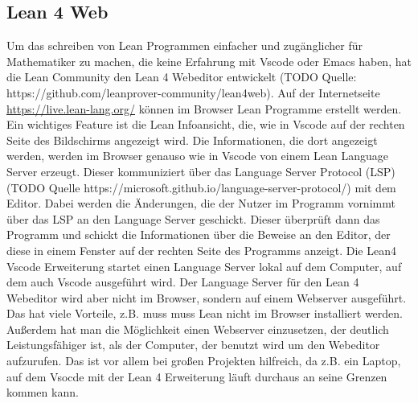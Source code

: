 \documentclass[10pt]{article}
\begin{document}
\subsection{Lean 4 Web}
Um das schreiben von Lean Programmen einfacher und zugänglicher für Mathematiker zu machen, die keine Erfahrung mit Vscode oder Emacs haben, hat die Lean Community den Lean 4 Webeditor entwickelt (TODO Quelle: https://github.com/leanprover-community/lean4web). Auf der Internetseite \href{https://live.lean-lang.org/}{https://live.lean-lang.org/} können im Browser Lean Programme erstellt werden. Ein wichtiges Feature ist die Lean Infoansicht, die, wie in Vscode auf der rechten Seite des Bildschirms angezeigt wird. Die Informationen, die dort angezeigt werden, werden im Browser genauso wie in Vscode von einem Lean Language Server erzeugt. Dieser kommuniziert über das Language Server Protocol (LSP)(TODO Quelle https://microsoft.github.io/language-server-protocol/) mit dem Editor. Dabei werden die Änderungen, die der Nutzer im Programm vornimmt über das LSP an den Language Server geschickt. Dieser überprüft dann das Programm und schickt die Informationen über die Beweise an den Editor, der diese in einem Fenster auf der rechten Seite des Programms anzeigt. Die Lean4 Vscode Erweiterung startet einen Language Server lokal auf dem Computer, auf dem auch Vscode ausgeführt wird. Der Language Server für den Lean 4 Webeditor wird aber nicht im Browser, sondern auf einem Webserver ausgeführt. Das hat viele Vorteile, z.B. muss muss Lean nicht im Browser installiert werden. Außerdem hat man die Möglichkeit einen Webserver einzusetzen, der deutlich Leistungsfähiger ist, als der Computer, der benutzt wird um den Webeditor aufzurufen. Das ist vor allem bei großen Projekten hilfreich, da z.B. ein Laptop, auf dem Vsocde mit der Lean 4 Erweiterung läuft durchaus an seine Grenzen kommen kann. 
\end{document}
